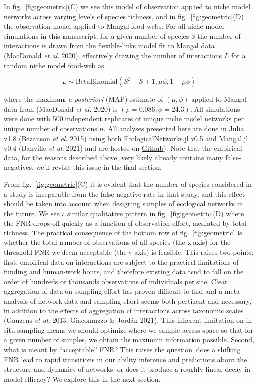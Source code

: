 \documentclass[11pt]{article}
\begin{document}
In fig.~\ref{fig:geometric}(C) we see this model of observation applied
to niche model networks across varying levels of species richness, and
in fig.~\ref{fig:geometric}(D) the observation model applied to Mangal
food webs. For all niche model simulations in this manuscript, for a
given number of species \(S\) the number of interactions is drawn from
the flexible-links model fit to Mangal data (MacDonald \emph{et al.}
2020), effectively drawing the number of interactions \(L\) for a random
niche model food-web as

\[L \sim  \text{BetaBinomial}(S^2-S+1,\mu\phi, 1-\mu\phi)\]

where the maximum \emph{a posteriori} (MAP) estimate of \((\mu, \phi)\)
applied to Mangal data from (MacDonald \emph{et al.} 2020) is
\((\mu=0.086, \phi=24.3)\). All simulations were done with 500
independent replicates of unique niche model networks per unique number
of observations \(n\). All analyses presented here are done in Julia
v1.8 (Bezanson \emph{et al.} 2015) using both EcologicalNetworks.jl v0.5
and Mangal.jl v0.4 (Banville \emph{et al.} 2021) and are hosted on
\href{https://github.com/gottacatchenall/ms_false_negatives/tree/main/src}{Github}).
Note that the empirical data, for the reasons described above, very
likely already contains many false-negatives, we'll revisit this issue
in the final section.

From fig.~\ref{fig:geometric}(C) it is evident that the number of
species considered in a study is inseparable from the
false-negative-rate in that study, and this effect should be taken into
account when designing samples of ecological networks in the future. We
see a similar qualitative pattern in fig.~\ref{fig:geometric}(D) where
the FNR drops off quickly as a function of observation effort, mediated
by total richness. The practical consequence of the bottom row of
fig.~\ref{fig:geometric} is whether the total number of observations of
all species (the x-axis) for the threshold FNR we deem acceptable (the
y-axis) is feasible. This raises two points: first, empirical data on
interactions are subject to the practical limitations of funding and
human-work hours, and therefore existing data tend to fall on the order
of hundreds or thousands observations of individuals per site. Clear
aggregation of data on sampling effort has proven difficult to find and
a meta-analysis of network data and sampling effort seems both pertinent
and necessary, in addition to the effects of aggregation of interactions
across taxonomic scales (Gauzens \emph{et al.} 2013; Giacomuzzo \&
Jordán 2021). This inherent limitation on in-situ sampling means we
should optimize where we sample across space so that for a given number
of samples, we obtain the maximum information possible. Second, what is
meant by ``acceptable'' FNR? This raises the question: does a shifting
FNR lead to rapid transitions in our ability inference and predictions
about the structure and dynamics of networks, or does it produce a
roughly linear decay in model efficacy? We explore this in the next
section.
\end{document}
